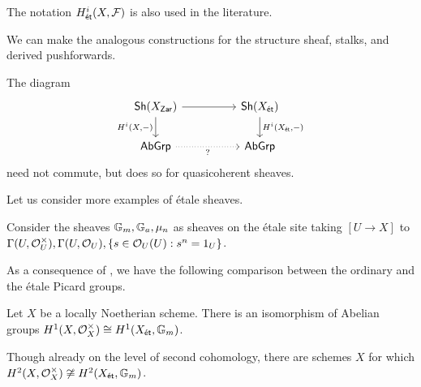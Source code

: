 \begin{remark}
    The notation $H^{i}_{\mathsf{\acute{e}t}}(X,\mathcal{F})$ is also used in the literature. 
\end{remark}
We can make the analogous constructions for the structure sheaf, stalks, and derived pushforwards. 
\begin{remark}\label{rmk: commutes for QCoh}
    The diagram 
    $$%
    \begin{tikzcd}
        {\Sh(X_{\Zar})} && {\Sh(X_{\et})} \\
        \AbGrp && \AbGrp
        \arrow[from=1-1, to=1-3]
        \arrow["{H^{i}(X,-)}"', from=1-1, to=2-1]
        \arrow["{H^{i}(X_{\et},-)}", from=1-3, to=2-3]
        \arrow["{?}"', dotted, from=2-1, to=2-3]
    \end{tikzcd}$$
    need not commute, but does so for quasicoherent sheaves. 
\end{remark}

Let us consider more examples of \'{e}tale sheaves. 
\begin{example}
    Consider the sheaves $\mathbb{G}_{m},\mathbb{G}_{a},\mu_{n}$ as sheaves on the \'{e}tale site taking $[U\to X]$ to $\Gamma(U,\mathcal{O}_{U}^{\times}), \Gamma(U,\mathcal{O}_{U}), \{s\in\mathcal{O}_{U}(U):s^{n}=1_{U}\}$. 
\end{example}

As a consequence of , we have the following comparison between the ordinary and the \'{e}tale Picard groups. 
\begin{proposition}\label{prop: picard group comparison}
    Let $X$ be a locally Noetherian scheme. There is an isomorphism of Abelian groups $H^{1}(X,\mathcal{O}_{X}^{\times})\cong H^{1}(X_{\mathsf{\acute{e}t}},\mathbb{G}_{m})$. 
\end{proposition}
Though already on the level of second cohomology, there are schemes $X$ for which $H^{2}(X,\mathcal{O}_{X}^{\times})\not\cong H^{2}(X_{\mathsf{\acute{e}t}},\mathbb{G}_{m})$. 

